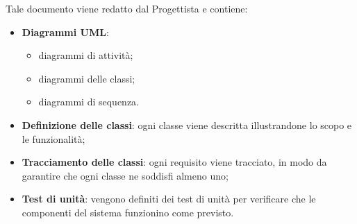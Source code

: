   Tale documento viene redatto dal Progettista e contiene:
  \begin{itemize}
     	\item \textbf{Diagrammi UML}:
			\begin{itemize}
				\item{diagrammi di attività;}
   				\item{diagrammi delle classi;}
				\item{diagrammi di sequenza.}
			\end{itemize}
		\item \textbf{Definizione delle classi}: ogni classe viene descritta illustrandone lo scopo e le funzionalità;
		\item \textbf{Tracciamento delle classi}: ogni requisito viene tracciato, in modo da garantire che ogni classe ne soddisfi almeno uno; 
		\item \textbf{Test di unità}: vengono definiti dei test di unità per verificare che le componenti del sistema funzionino come previsto. 
  \end{itemize}
 
